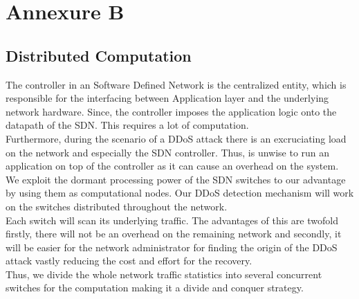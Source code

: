 \documentclass[12pt,a4paper,final]{report}
\DeclareRobustCommand{\gobblefive}[5]{}
\newcommand*{\SkipTocEntry}{\addtocontents{toc}{\gobblefive}}
\begin{document}
{{{{{
\SkipTocEntry\chapter{Annexure B}
\thispagestyle{empty}
\newpage
\SkipTocEntry\section{Distributed Computation}
The controller in an Software Defined Network is the centralized entity, which is responsible for the interfacing between Application layer and the underlying network hardware. Since, the controller imposes the application logic onto the datapath of the SDN. This requires a lot of computation. \\

	Furthermore, during the scenario of a DDoS attack there is an excruciating load on the network and especially the SDN controller.	Thus, is unwise to run an application on top of the controller as it can cause an overhead on the system. We exploit the dormant processing power of the SDN switches to our advantage by using them as computational nodes. Our DDoS detection mechanism will work on the switches distributed throughout the network. \\

Each switch will scan its underlying traffic. The advantages of this are twofold firstly, there will not be an overhead on the remaining network and secondly, it will be easier for the network administrator for finding the origin of the DDoS attack vastly reducing the cost and effort for the recovery. \\

Thus, we divide the whole network traffic statistics into several concurrent switches for the computation making it a divide and conquer strategy.

}}}}}
\end{document}
